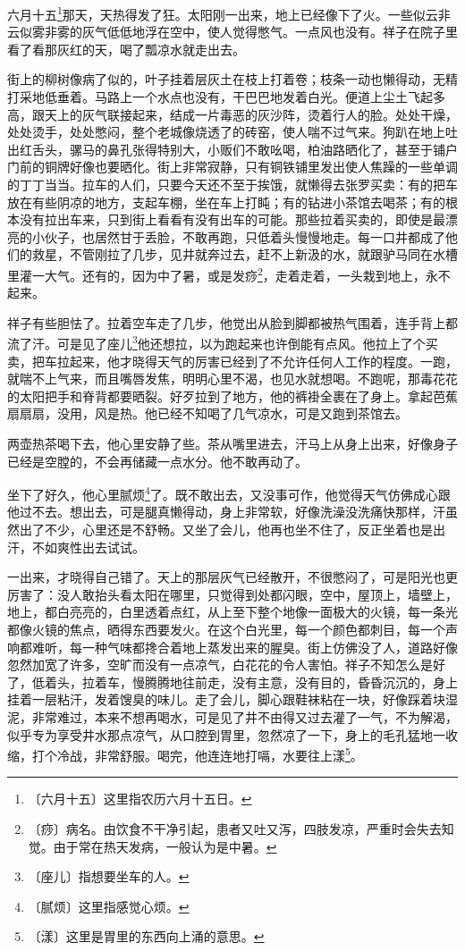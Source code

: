 \documentclass[12pt,UTF-8,openany]{ctexbook}
\begin{document}
\begin{normalsize}
    
    六月十五\footnote{〔六月十五〕这里指农历六月十五日。}那天，天热得发了狂。太阳刚一出来，地上已经像下了火。一些似云非云似雾非雾的灰气低低地浮在空中，使人觉得憋气。一点风也没有。祥子在院子里看了看那灰红的天，喝了瓢凉水就走出去。
    
    街上的柳树像病了似的，叶子挂着层灰土在枝上打着卷；枝条一动也懒得动，无精打采地低垂着。马路上一个水点也没有，干巴巴地发着白光。便道上尘土飞起多高，跟天上的灰气联接起来，结成一片毒恶的灰沙阵，烫着行人的脸。处处干燥，处处烫手，处处憋闷，整个老城像烧透了的砖窑，使人喘不过气来。狗趴在地上吐出红舌头，骡马的鼻孔张得特别大，小贩们不敢吆喝，柏油路晒化了，甚至于铺户门前的铜牌好像也要晒化。街上非常寂静，只有铜铁铺里发出使人焦躁的一些单调的丁丁当当。拉车的人们，只要今天还不至于挨饿，就懒得去张罗买卖：有的把车放在有些阴凉的地方，支起车棚，坐在车上打盹；有的钻进小茶馆去喝茶；有的根本没有拉出车来，只到街上看看有没有出车的可能。那些拉着买卖的，即使是最漂亮的小伙子，也居然甘于丢脸，不敢再跑，只低着头慢慢地走。每一口井都成了他们的救星，不管刚拉了几步，见井就奔过去，赶不上新汲的水，就跟驴马同在水槽里灌一大气。还有的，因为中了暑，或是发痧\footnote{〔痧〕病名。由饮食不干净引起，患者又吐又泻，四肢发凉，严重时会失去知觉。由于常在热天发病，一般认为是中暑。}，走着走着，一头栽到地上，永不起来。
    
    祥子有些胆怯了。拉着空车走了几步，他觉出从脸到脚都被热气围着，连手背上都流了汗。可是见了座儿\footnote{〔座儿〕指想要坐车的人。}他还想拉，以为跑起来也许倒能有点风。他拉上了个买卖，把车拉起来，他才晓得天气的厉害已经到了不允许任何人工作的程度。一跑，就喘不上气来，而且嘴唇发焦，明明心里不渴，也见水就想喝。不跑呢，那毒花花的太阳把手和脊背都要晒裂。好歹拉到了地方，他的裤褂全裹在了身上。拿起芭蕉扇扇扇，没用，风是热。他已经不知喝了几气凉水，可是又跑到茶馆去。
    
    两壶热茶喝下去，他心里安静了些。茶从嘴里进去，汗马上从身上出来，好像身子已经是空膛的，不会再储藏一点水分。他不敢再动了。
    
    坐下了好久，他心里腻烦\footnote{〔腻烦〕这里指感觉心烦。}了。既不敢出去，又没事可作，他觉得天气仿佛成心跟他过不去。想出去，可是腿真懒得动，身上非常软，好像洗澡没洗痛快那样，汗虽然出了不少，心里还是不舒畅。又坐了会儿，他再也坐不住了，反正坐着也是出汗，不如爽性出去试试。
    
    一出来，才晓得自己错了。天上的那层灰气已经散开，不很憋闷了，可是阳光也更厉害了：没人敢抬头看太阳在哪里，只觉得到处都闪眼，空中，屋顶上，墙壁上，地上，都白亮亮的，白里透着点红，从上至下整个地像一面极大的火镜，每一条光都像火镜的焦点，晒得东西要发火。在这个白光里，每一个颜色都刺目，每一个声响都难听，每一种气味都搀合着地上蒸发出来的腥臭。街上仿佛没了人，道路好像忽然加宽了许多，空旷而没有一点凉气，白花花的令人害怕。祥子不知怎么是好了，低着头，拉着车，慢腾腾地往前走，没有主意，没有目的，昏昏沉沉的，身上挂着一层粘汗，发着馊臭的味儿。走了会儿，脚心跟鞋袜粘在一块，好像踩着块湿泥，非常难过，本来不想再喝水，可是见了井不由得又过去灌了一气，不为解渴，似乎专为享受井水那点凉气，从口腔到胃里，忽然凉了一下，身上的毛孔猛地一收缩，打个冷战，非常舒服。喝完，他连连地打嗝，水要往上漾\footnote{〔漾〕这里是胃里的东西向上涌的意思。}。
    

\end{normalsize}
\end{document}
